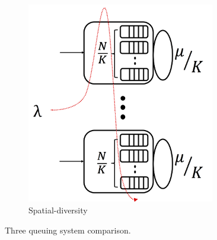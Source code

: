 \begin{figure}
\begin{subfigure}[b]{0.3\textwidth}
		\label{fig:enn}
	\end{subfigure}
	\hfill
	\begin{subfigure}[b]{0.3\textwidth}
		\centering
		\includegraphics[width=0.9\textwidth]{Chapter3/Figures/sdmlfq}
		\caption{Spatial-diversity}
		\label{fig:sdmlfq}
	\end{subfigure}
	\caption{Three queuing system comparison.} %
	\label{fig:three-system-comparison}
\end{figure}

